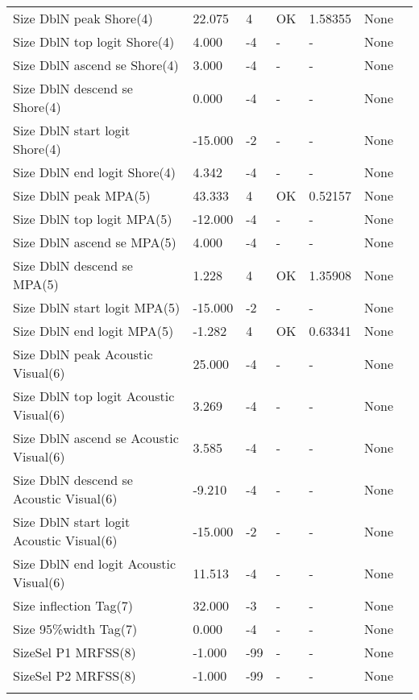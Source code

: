 \documentclass[11pt,
  english,
  letterpaper,
]{article}
\begin{document}
\begin{landscape}
\begin{longtable}[t]{>{\raggedright\arraybackslash}p{6cm}lllll>{\raggedright\arraybackslash}p{4cm}}
Size DblN peak Shore(4) & 22.075 & 4 & OK & 1.58355 & None\\
Size DblN top logit Shore(4) & 4.000 & -4 & - & - & None\\
Size DblN ascend se Shore(4) & 3.000 & -4 & - & - & None\\
Size DblN descend se Shore(4) & 0.000 & -4 & - & - & None\\
Size DblN start logit Shore(4) & -15.000 & -2 & - & - & None\\
Size DblN end logit Shore(4) & 4.342 & -4 & - & - & None\\
Size DblN peak MPA(5) & 43.333 & 4 & OK & 0.52157 & None\\
Size DblN top logit MPA(5) & -12.000 & -4 & - & - & None\\
Size DblN ascend se MPA(5) & 4.000 & -4 & - & - & None\\
Size DblN descend se MPA(5) & 1.228 & 4 & OK & 1.35908 & None\\
Size DblN start logit MPA(5) & -15.000 & -2 & - & - & None\\
Size DblN end logit MPA(5) & -1.282 & 4 & OK & 0.63341 & None\\
Size DblN peak Acoustic Visual(6) & 25.000 & -4 & - & - & None\\
Size DblN top logit Acoustic Visual(6) & 3.269 & -4 & - & - & None\\
Size DblN ascend se Acoustic Visual(6) & 3.585 & -4 & - & - & None\\
Size DblN descend se Acoustic Visual(6) & -9.210 & -4 & - & - & None\\
Size DblN start logit Acoustic Visual(6) & -15.000 & -2 & - & - & None\\
Size DblN end logit Acoustic Visual(6) & 11.513 & -4 & - & - & None\\
Size inflection Tag(7) & 32.000 & -3 & - & - & None\\
Size 95\%width Tag(7) & 0.000 & -4 & - & - & None\\
SizeSel P1 MRFSS(8) & -1.000 & -99 & - & - & None\\
SizeSel P2 MRFSS(8) & -1.000 & -99 & - & - & None\\*
\end{longtable}
\endgroup{}
\end{landscape}
\endgroup{}

\newpage




\end{document}

